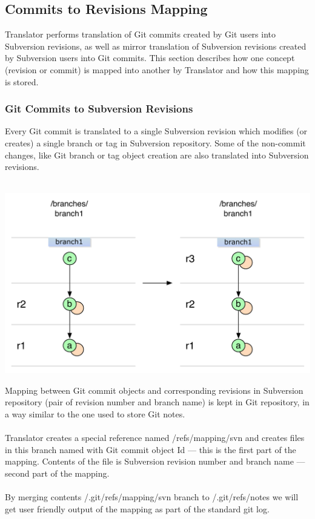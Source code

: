 \subsection{Commits to Revisions Mapping}
\renewcommand{\figurename}{Diagram}

Translator performs translation of Git commits created by Git users into Subversion revisions, as well
as mirror translation of Subversion revisions created by Subversion users into Git commits. This section
describes how one concept (revision or commit) is mapped into another by Translator and how this mapping 
is stored.

\subsubsection{Git Commits to Subversion Revisions}

Every Git commit is translated to a single Subversion revision which modifies (or creates) a single branch or tag
in Subversion repository. Some of the non-commit changes, like Git branch or tag object creation are also translated into Subversion revisions.\\\\
\begin{center}
\includegraphics[width=\textwidth]{img/diagrams/single_change_git_to_svn.pdf}%
\label{simple_git_to_svn}%
\end{center}

Mapping between Git commit objects and corresponding revisions in Subversion repository (pair of revision number and branch name) is 
kept in Git repository, in a way similar to the one used to store Git notes. 
\\\\
Translator creates a special reference named /refs/mapping/svn and creates files in this branch named with Git commit object Id --- this is the first part of the mapping. 
Contents of the file is Subversion revision number and branch name --- second part of the mapping.
\\\\ 
By merging contents /.git/refs/mapping/svn branch to /.git/refs/notes we will get user friendly output of the mapping as part of the standard git log.

